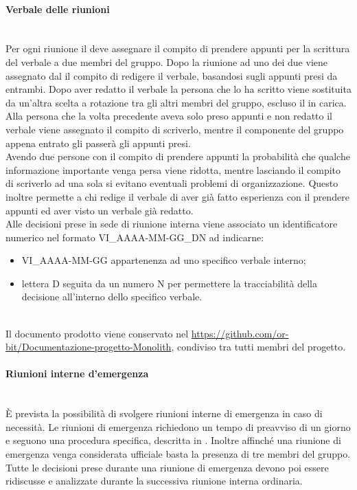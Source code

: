 \paragraph{Verbale delle riunioni}\label{sec:verbale_riunioni_interne}\mbox{}\\
Per ogni riunione il \Responsabile{} deve assegnare il compito di prendere appunti per la scrittura del verbale a due membri del gruppo. Dopo la riunione ad uno dei due viene assegnato dal \Responsabile{} il compito di redigere il verbale, basandosi sugli appunti presi da entrambi. 
Dopo aver redatto il verbale la persona che lo ha scritto viene sostituita da un’altra scelta a rotazione tra gli altri membri del gruppo, escluso il \Responsabile{} in carica. Alla persona che la volta precedente aveva solo preso appunti e non redatto il verbale viene assegnato il compito di scriverlo, mentre il componente del gruppo appena entrato gli passerà gli appunti presi.\\
Avendo due persone con il compito di prendere appunti la probabilità che qualche informazione importante venga persa viene ridotta, mentre lasciando il compito di scriverlo ad una sola si evitano eventuali problemi di organizzazione.
Questo inoltre permette a chi redige il verbale di aver già fatto esperienza con il prendere appunti ed aver visto un verbale già redatto.\\
Alle decisioni prese in sede di riunione interna viene associato un identificatore numerico nel formato VI\_AAAA-MM-GG\_DN ad indicarne:
\begin{itemize}
	\item VI\_AAAA-MM-GG appartenenza ad uno specifico verbale interno;
	\item lettera D seguita da un numero N per permettere la tracciabilità della decisione all'interno dello specifico verbale.
\end{itemize}\\
Il documento prodotto viene conservato nel 
\sloppy \url{https://github.com/or-bit/Documentazione-progetto-Monolith}, condiviso tra tutti membri del progetto.

\paragraph{Riunioni interne d'emergenza}\label{sec:riunioni_emergenza}\mbox{}\\
\`{E} prevista la possibilità di svolgere riunioni interne di emergenza in caso di necessità. Le riunioni di emergenza richiedono un tempo di preavviso di un giorno e seguono una procedura specifica, descritta in . Inoltre affinché una riunione di emergenza venga considerata ufficiale basta la presenza di tre membri del gruppo.\\
Tutte le decisioni prese durante una riunione di emergenza devono poi essere ridiscusse e analizzate durante la successiva riunione interna ordinaria.


